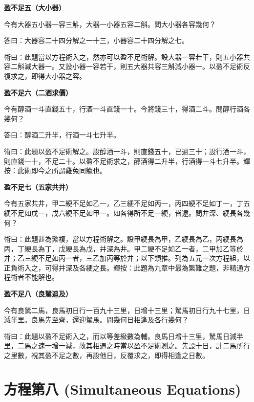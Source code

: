 \documentclass[11pt,a4paper]{article}
\newenvironment{problemenv}[1]{%
  \medskip\noindent\textbf{#1}\par\nopagebreak\smallskip
}{\medskip}
\begin{document}
\begin{problemenv}{盈不足五（大小器）}
今有大器五小器一容三斛，大器一小器五容二斛。問大小器各容幾何？

\textsf{答曰：}大器容二十四分解之一十三，小器容二十四分解之七。

\textsf{術曰：}此題當以方程術入之，然亦可以盈不足術解。設大器一容若干，則五小器共容二斛減大器一。又設小器一容若干，則五大器共容三斛減小器一。以盈不足術反復求之，即得大小器之容。
\end{problemenv}

\begin{problemenv}{盈不足六（二酒求價）}
今有醇酒一斗直錢五十，行酒一斗直錢一十。今將錢三十，得酒二斗。問醇行酒各幾何？

\textsf{答曰：}醇酒二升半，行酒一斗七升半。

\textsf{術曰：}此題以盈不足術解之。設醇酒一斗，則直錢五十，已過三十；設行酒一斗，則直錢一十，不足二十。以盈不足術求之，醇酒得二升半，行酒得一斗七升半。輝按：此術即今之所謂雞兔同籠也。
\end{problemenv}

\begin{problemenv}{盈不足七（五家共井）}
今有五家共井，甲二綆不足如乙一，乙三綆不足如丙一，丙四綆不足如丁一，丁五綆不足如戊一，戊六綆不足如甲一。如各得所不足一綆，皆逮。問井深、綆長各幾何？

\textsf{術曰：}此題甚為繁複，當以方程術解之。設甲綆長為甲，乙綆長為乙，丙綆長為丙，丁綆長為丁，戊綆長為戊，井深為井。甲二綆不足如乙一者，二甲加乙等於井；乙三綆不足如丙一者，三乙加丙等於井；以下類推。列為五元一次方程組，以正負術入之，可得井深及各綆之長。輝按：此題為九章中最為繁難之題，非精通方程術者不能解也。
\end{problemenv}

\begin{problemenv}{盈不足八（良駑追及）}
今有良駑二馬，良馬初日行一百九十三里，日增十三里；駑馬初日行九十七里，日減半里。良馬先至齊，還迎駑馬。問幾何日相逢及各行幾何？

\textsf{術曰：}此題以盈不足術入之，而以等差級數為輔。良馬日增十三里，駑馬日減半里，二馬之速一增一減，故其相遇之時當以盈不足術測之。先設十日，計二馬所行之里數，視其盈不足之數，再設他日，反覆求之，即得相逢之日數。
\end{problemenv}

\newpage
\section{方程第八 (Simultaneous Equations)}
\end{document}
